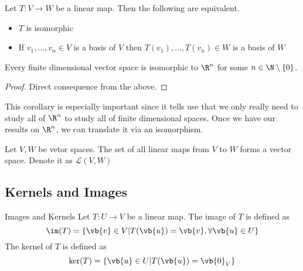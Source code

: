 \begin{thm}{}{} Let $T:V\to W$ be a linear map. Then the following are equivalent. 
\begin{itemize}
\item $T$ is isomorphic
\item If $v_1,\dots,v_n\in V$ is a basis of $V$ then $T(v_1),\dots,T(v_n)\in W$ is a basis of $W$
\end{itemize}
\end{thm}

\begin{crl}{}{} Every finite dimensional vector space is isomorphic to $\R^n$ for some $n\in\N\setminus\{0\}$. \tcbline
\begin{proof} Direct consequence from the above. 
\end{proof}
\end{crl}

This corollary is especially important since it tells use that we only really need to study all of $\R^n$ to study all of finite dimensional spaces. Once we have our results on $\R^n$, we can translate it via an isomorphism. 

\begin{prp}{}{} Let $V,W$ be vetor spaces. The set of all linear maps from $V$ to $W$ forms a vector space. Denote it as $\mathcal{L}(V,W)$
\end{prp}

\subsection{Kernels and Images}
\begin{defn}{Images and Kernels}{} Let $T:U\to V$ be a linear map. The image of $T$ is defined as $$\im(T)=\{\vb{v}\in V|T(\vb{u})=\vb{v}, \forall\vb{u}\in U\}$$ The kernel of $T$ is defined as $$\ker(T)=\{\vb{u}\in U|T(\vb{u})=\vb{0}_V\}$$
\end{defn}


